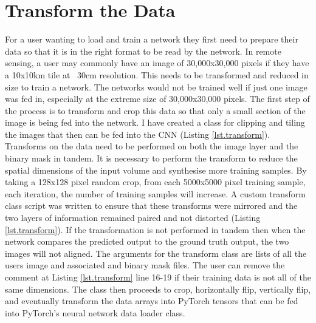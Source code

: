 \section{Transform the Data}\label{sec.transform}
For a user wanting to load and train a network they first need to prepare their data so that it is in the right format to be read by the network. In remote sensing, a user may commonly have an image of 30,000x30,000 pixels if they have a 10x10km tile at ~30cm resolution. This needs to be transformed and reduced in size to train a network. The networks would not be trained well if just one image was fed in, especially at the extreme size of 30,000x30,000 pixels. The first step of the process is to transform and crop this data so that only a small section of the image is being fed into the network. I have created a class for clipping and tiling the images that then can be fed into the CNN (Listing \ref{lst.transform}).
Transforms on the data need to be performed on both the image layer and the binary mask in tandem. It is necessary to perform the transform to reduce the spatial dimensions of the input volume and synthesise more training samples. By taking a 128x128 pixel random crop, from each 5000x5000 pixel training sample, each iteration, the number of training samples will increase. A custom transform class script was written to ensure that these transforms were mirrored and the two layers of information remained paired and not distorted (Listing \ref{lst.transform}). If the transformation is not performed in tandem then when the network compares the predicted output to the ground truth output, the two images will not aligned.
The arguments for the transform class are lists of all the users image and associated and binary mask files. The user can remove the comment at Listing \ref{lst.transform} line 16-19 if their training data is not all of the same dimensions. The class then proceeds to crop, horizontally flip, vertically flip, and eventually transform the data arrays into PyTorch tensors that can be fed into PyTorch's neural network data loader class. 
\par 
